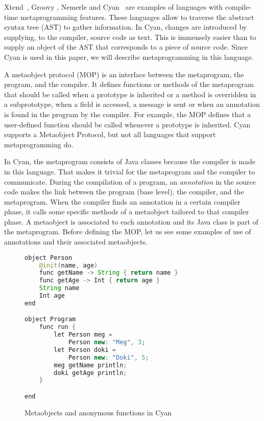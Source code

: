 \documentclass[preprint,review]{elsarticle}
\begin{document}
Xtend~\cite{rentschler2014designing},     Groovy    \cite{groovy2017},
Nemerle   \cite{kamil2005}  and  Cyan~\cite{guimaraes2013cyan}   are
examples of languages with compile-time metaprogramming features.  These languages
allow to traverse  the abstract syntax tree (AST) to gather
information. In Cyan, changes are introduced by supplying, to the compiler, source code as text. This is immensely easier than to supply an object of the AST that corresponds to a piece of source code.  Since  Cyan   is  used   in  this   paper,  we   will  describe
metaprogramming in this language.



A metaobject  protocol (MOP) is an interface between the  metaprogram, the program,
and the compiler.  It defines functions or methods  of the metaprogram
that should  be called when  a prototype is  inherited or a  method is
overridden in a  subprototype, when a field is accessed,  a message is
sent  or  when   an  annotation  is  found  in  the   program  by  the
compiler. For  example, the MOP  defines that a  user-defined function
should be  called whenever a  prototype is inherited. Cyan  supports a
Metaobject Protocol, but not all languages that support metaprogramming do.

In Cyan,
the metaprogram consists of Java  classes because the compiler is made in this language. That makes it trivial for the metaprogram and the compiler to communicate.
During the compilation of a program, an \textit{annotation} in the source code makes the link between the program (base level), the compiler, and the metaprogram. When the compiler finds an annotation in a certain compiler phase, it calls some specific methods of a metaobject tailored to that compiler phase. A metaobject is associated to each annotation and its Java class is part of the metaprogram. Before defining the MOP, let us see some examples of use of annotations and their associated metaobjects.


\begin{figure}[h]
\centering
\begin{lstlisting}[language=Java]
object Person
    @init(name, age)
    func getName -> String { return name }
    func getAge -> Int { return age }
    String name
    Int age
end

object Program
    func run {
        let Person meg =
            Person new: "Meg", 3;
        let Person doki =
            Person new: "Doki", 5;
        meg getName println;
        doki getAge println;
    }

end
\end{lstlisting}
\caption{Metaobjects and anonymous functions in Cyan}
\label{fig:ObservableExampleCyan}
\end{figure}
\end{document}
